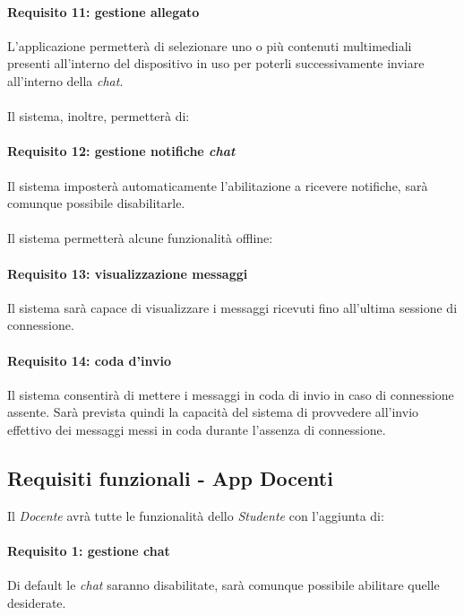 \paragraph{Requisito 11: gestione allegato\\}
L’applicazione permetterà di selezionare uno o più contenuti multimediali presenti all’interno del dispositivo in uso per poterli successivamente inviare all’interno della \emph{chat}.\\
\\
Il sistema, inoltre, permetterà di:

\paragraph{Requisito 12: gestione notifiche \emph{chat}\\}
Il sistema imposterà automaticamente l’abilitazione a ricevere notifiche, sarà comunque possibile disabilitarle.\\
\\
Il sistema permetterà alcune funzionalità offline:

\paragraph{Requisito 13: visualizzazione messaggi\\}
Il sistema sarà capace di visualizzare i messaggi ricevuti fino all’ultima sessione di connessione.

\paragraph{Requisito 14: coda d'invio\\}
Il sistema consentirà di mettere i messaggi in coda di invio in caso di connessione assente. Sarà prevista quindi la capacità del sistema di provvedere all’invio effettivo dei messaggi messi in coda durante l’assenza di connessione.

\subsection{Requisiti funzionali - App Docenti}
Il \emph{Docente} avrà tutte le funzionalità dello \emph{Studente} con l’aggiunta di:

\paragraph{Requisito 1: gestione chat\\}
Di default le \emph{chat} saranno disabilitate, sarà comunque possibile abilitare quelle desiderate.


